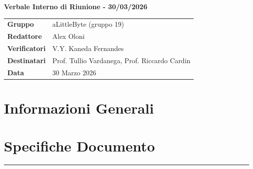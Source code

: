 \documentclass[a4paper,12pt]{article}
\begin{document}
\thispagestyle{firstpage}

\vspace*{0.5cm}

\begin{center}
    {\LARGE \textbf{Verbale Interno di Riunione - 30/03/2026}}
\end{center}

\vspace{1.5cm}

\begin{center}
    \renewcommand{\arraystretch}{1.3}
    \begin{tcolorbox}[
        width=0.92\textwidth,
        colback=gray!6,
        colframe=gray!45,
        boxrule=0.5pt,
        arc=2mm,
        boxsep=0pt,
        left=8pt, right=8pt, top=8pt, bottom=8pt
    ]
        \begin{tabularx}{\linewidth}{>{\bfseries}p{3.5cm} X}
            Gruppo      & aLittleByte (gruppo 19) \\
            Redattore   & Alex Oloni \\
            Verificatori & V.Y. Kaneda Fernandes\\
            Destinatari & Prof. Tullio Vardanega, Prof. Riccardo Cardin \\
            Data        & 30 Marzo 2026\\
        \end{tabularx}
    \end{tcolorbox}
\end{center}

\newpage

\tableofcontents
\newpage
\section{Informazioni Generali}
\section*{Specifiche Documento}
\hrule
\vspace{1cm}
\end{document}
